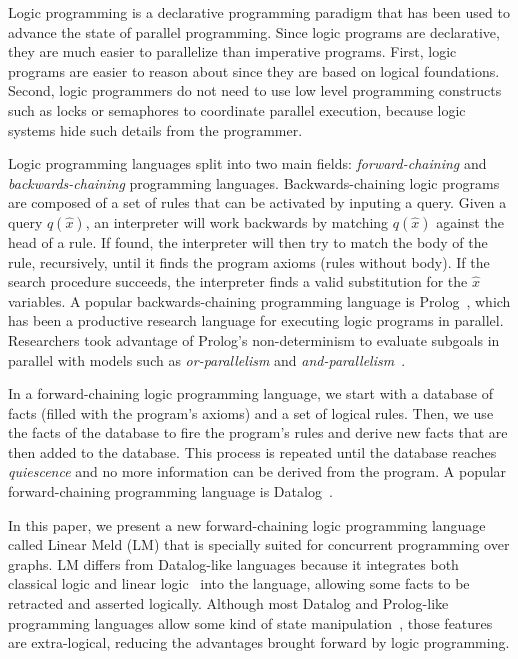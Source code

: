 Logic programming is a declarative programming paradigm that has been used to advance the state of parallel programming.
Since logic programs are declarative, they are much easier to parallelize than imperative programs.
First, logic programs are easier to reason about since they are based on logical foundations.
Second, logic programmers do not need to use low level programming constructs such as locks or semaphores to
coordinate parallel execution, because logic systems hide such details from the programmer.

Logic programming languages split into two main fields: \emph{forward-chaining} and \emph{backwards-chaining} 
programming languages. Backwards-chaining logic programs are composed of a set of rules that can be activated by inputing a query. Given a query $q(\hat{x})$, an interpreter will work backwards by matching $q(\hat{x})$ against the head of a rule. If found, the interpreter will then try to match the body of the rule, recursively, until it finds the program axioms (rules without body). If the search procedure succeeds, the interpreter finds a valid substitution for the $\hat{x}$ variables. A popular backwards-chaining programming
language is Prolog~\cite{Colmerauer:1993:BP:154766.155362}, which has been a productive research language for executing logic
programs in parallel. Researchers took advantage of Prolog's non-determinism to evaluate subgoals
in parallel with models such as \emph{or-parallelism} and \emph{and-parallelism}~\cite{Gupta:2001:PEP:504083.504085}.

In a forward-chaining logic programming language, we start with a database of facts (filled with the program's
axioms) and a set of logical rules. Then, we use the facts of the database to fire the program's rules and derive new facts that are
then added to the database. This process is repeated until the database reaches \emph{quiescence} and no more information can
be derived from the program.
A popular forward-chaining programming language is Datalog~\cite{Ramakrishnan93asurvey}.

In this paper, we present a new forward-chaining logic programming language called Linear Meld (LM) that is specially suited
for concurrent programming over graphs. LM differs from Datalog-like languages because it integrates both classical
logic and linear logic~\cite{girard-87} into the language, allowing some facts to be retracted and asserted logically. Although most
Datalog and Prolog-like programming languages allow some kind of state manipulation~\cite{Liu98extendingdatalog}, those features
are extra-logical, reducing the advantages brought forward by logic programming.

